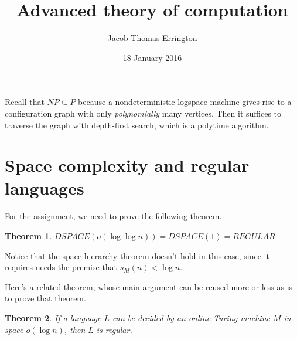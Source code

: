 \documentclass{article}
\author{Jacob Thomas Errington}
\title{Advanced theory of computation}
\date{18 January 2016}
\newtheorem{theorem}{Theorem}
\begin{document}
\maketitle

Recall that $NP \subseteq P$ because a nondeterministic logspace machine gives
rise to a configuration graph with only \emph{polynomially} many vertices. Then
it suffices to traverse the graph with depth-first search, which is a polytime
algorithm.

\section{Space complexity and regular languages}

For the assignment, we need to prove the following theorem.

\begin{theorem}
    $DSPACE(o(\log \log n)) = DSPACE(1) = REGULAR$
\end{theorem}

Notice that the space hierarchy theorem doesn't hold in this case, since it
requires needs the premise that $s_M(n) < \log n$.

Here's a related theorem, whose main argument can be reused more or less as is
to prove that theorem.

\begin{theorem}
    If a language $L$ can be decided by an online Turing machine $M$ in space
    $o(\log n)$, then $L$ is regular.
\end{theorem}
\end{document}
